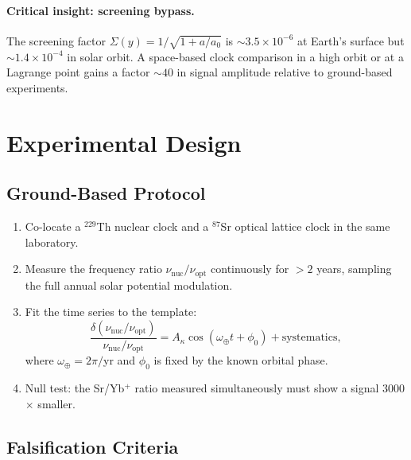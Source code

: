 \documentclass[11pt]{article}
\newcommand{\ee}[1]{\times 10^{#1}}
\begin{document}
\paragraph{Critical insight: screening bypass.}
The screening factor $\Sigma(y) = 1/\sqrt{1 + a/a_0}$ is
$\sim 3.5\ee{-6}$ at Earth's surface but $\sim 1.4\ee{-4}$ in
solar orbit.  A space-based clock comparison in a high orbit or
at a Lagrange point gains a factor $\sim 40$ in signal amplitude
relative to ground-based experiments.

\section{Experimental Design}
\label{sec:clock-design}

\subsection{Ground-Based Protocol}

\begin{enumerate}
\item Co-locate a $^{229}$Th nuclear clock and a $^{87}$Sr optical
lattice clock in the same laboratory.

\item Measure the frequency ratio $\nu_{\text{nuc}}/\nu_{\text{opt}}$
continuously for $> 2$ years, sampling the full annual solar
potential modulation.

\item Fit the time series to the template:
\begin{equation}
\frac{\delta(\nu_{\text{nuc}}/\nu_{\text{opt}})}
{\nu_{\text{nuc}}/\nu_{\text{opt}}}
= A_{\kappa}\cos(\omega_\oplus t + \phi_0) + \text{systematics},
\end{equation}
where $\omega_\oplus = 2\pi/$yr and $\phi_0$ is fixed by the
known orbital phase.

\item Null test: the Sr/Yb$^+$ ratio measured simultaneously must
show a signal 3000$\times$ smaller.
\end{enumerate}

\subsection{Falsification Criteria}
\end{document}
